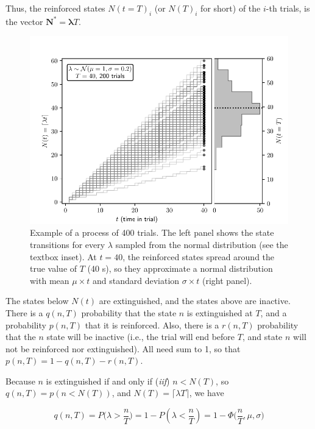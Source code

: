 \documentclass[11pt]{article}
\begin{document}
Thus, the reinforced states $N(t = T)_i$ (or $N(T)_i$ for short) of the $i$-th trials, is the vector
$\mathbf{N^*} = \boldsymbol{\lambda} T$.

    \begin{figure}[H]
            \centering
            \includegraphics[scale=0.7]{nt_let}
            \caption{Example of a process of 400 trials. The left panel shows the state transitions for every
                    $\lambda$ sampled from the normal distribution (see the textbox inset). At $t = 40$, the reinforced
                    states spread around the true value of $T$ (40 s), so they approximate a normal distribution with mean
                    $\mu \times t$ and standard deviation $\sigma \times t$ (right panel).}
    \end{figure}

    The states below $N(t)$ are extinguished, and the states above are inactive.
    There is a $q(n,T)$ probability that the state $n$ is extinguished at $T$, and a probability $p(n,T)$ that it is reinforced.
    Also, there is a $r(n,T)$ probability that the $n$ state will be inactive (i.e., the trial will end before $T$, and
    state $n$ will not be reinforced nor extinguished).
    All need sum to 1, so that $p(n,T) = 1 - q(n,T) - r(n,T)$.

Because $n$ is extinguished if and only if (\textit{iif}) $n < N(T)$, so $q(n,T) = p(n < N(T))$,
and $N(T) = \lceil \lambda T \rceil$, we have

    \[
        q(n,T) = P \Big(\lambda > \frac{n}{T}\Big) = 1 - P(\lambda < \frac{n}{T}) = 1 - \Phi \Big (\frac{n}{T}, \mu, \sigma \Big)
    \]
\end{document}
